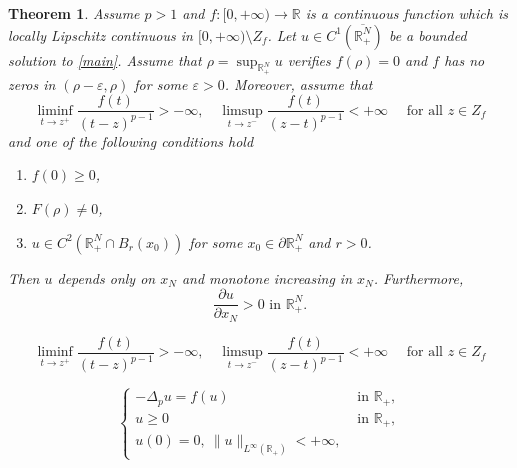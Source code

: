 \documentclass[10pt,a4paper]{amsart}
\newtheorem{theorem}{Theorem}
\begin{document}
	\begin{theorem}\label{th:main}
		Assume $p>1$ and $f:[0,+\infty)\to\mathbb{R}$ is a continuous function which is locally Lipschitz continuous in $[0,+\infty)\setminus Z_f$. Let $u\in C^1(\overline{\mathbb{R}^N_+})$ be a bounded solution to \eqref{main}. Assume that $\rho=\sup_{\mathbb{R}^N_+} u$ verifies $f(\rho)=0$ and $f$ has no zeros in $(\rho-\varepsilon,\rho)$ for some $\varepsilon>0$. Moreover, assume that		
		\begin{equation}\label{smp_cond}
			\liminf_{t\to z^+} \frac{f(t)}{(t-z)^{p-1}} > -\infty,\quad
			\limsup_{t\to z^-} \frac{f(t)}{(z-t)^{p-1}} < +\infty
			\quad\text{ for all } z\in Z_f
		\end{equation}
		and one of the following conditions hold
		\begin{enumerate}
			\item[(i)] $f(0)\ge0$,
			\item[(ii)] $F(\rho)\ne0$,
			\item[(iii)] $u\in C^2(\mathbb{R}^N_+\cap B_r(x_0))$ for some $x_0\in\partial\mathbb{R}^N_+$ and $r>0$.
		\end{enumerate}
		Then $u$ depends only on $x_N$ and monotone increasing in $x_N$. Furthermore,
		\begin{equation}\label{deri}
			\frac{\partial u}{\partial x_N} > 0 \text{ in } \mathbb{R}^N_+.
		\end{equation}
	\end{theorem}

		\begin{equation}
			\liminf_{t\to z^+} \frac{f(t)}{(t-z)^{p-1}} > -\infty,\quad
			\limsup_{t\to z^-} \frac{f(t)}{(z-t)^{p-1}} < +\infty
			\quad\text{ for all } z\in Z_f
		\end{equation}

	\begin{equation}\label{1D}
		\begin{cases}
			-\Delta_p u = f(u) & \text{ in } \mathbb{R}_+,\\
			u \ge 0 & \text{ in } \mathbb{R}_+,\\
			u(0)=0, ~ \|u\|_{L^\infty(\mathbb{R}_+)}<+\infty,
		\end{cases}
	\end{equation}
\end{document}
